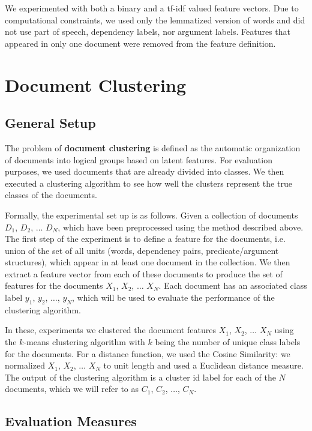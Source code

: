 \documentclass[11pt]{article}
\newcommand{\bt}[1]{\textbf{#1}}
\begin{document}
We experimented with both a binary and a tf-idf valued feature vectors. Due to computational constraints, we used only the lemmatized version of words and did not use part of speech, dependency labels, nor argument labels. Features that appeared in only one document were removed from the feature definition.


\section{Document Clustering} \label{sec:DocumentClusterting}

\subsection{General Setup}

The problem of \bt{document clustering} is defined as the automatic organization of documents into logical groups based on latent features. For evaluation purposes, we used documents that are already divided into classes. We then executed a clustering algorithm to see how well the clusters represent the true classes of the documents. 

Formally, the experimental set up is as follows. Given a collection of documents $D_1$, $D_2$, $\dots$ $D_N$,  which have been preprocessed using the method described above. The first step of the experiment is to define a feature for the documents, i.e. union of the set of all units (words, dependency pairs, predicate/argument structures), which appear in at least one document in the collection. We then extract a feature vector from each of these documents to produce the set of features for the documents $X_1$, $X_2$, $\dots$ $X_N$. Each document has an associated class label $y_1$, $y_2$, $\dots$, $y_N$, which will be used to evaluate the performance of the clustering algorithm.

In these, experiments we clustered the document features $X_1$, $X_2$, $\dots$ $X_N$ using the $k$-means clustering algorithm with $k$ being the number of unique class labels for the documents. For a distance function, we used the Cosine Similarity: we normalized $X_1$, $X_2$, $\dots$ $X_N$  to unit length and used a Euclidean distance measure. The output of the clustering algorithm is a cluster id label for each of the $N$ documents, which we will refer to as $C_1$, $C_2$, $\dots$, $C_N$. 


\subsection{Evaluation Measures}
\end{document}

